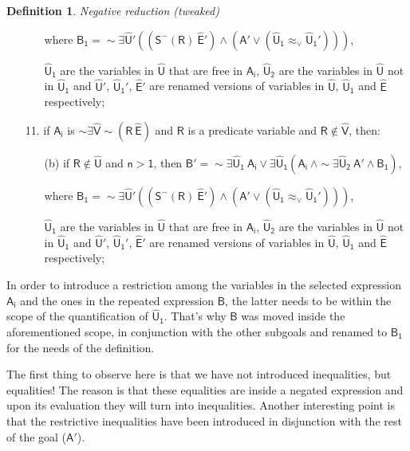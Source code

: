 \documentclass[inscr,ack,preface]{dithesis}
\theoremstyle{definition}
\newtheorem{definition}{Definition}[]
\newcommand{\msf}[1]{$\mathsf{#1}$}
\begin{document}
\begin{definition}{\emph{Negative reduction (tweaked)}}
\begin{enumerate}
\begin{enumerate}
                where \msf{B_{1} = \sim\exists \widehat{U}' \left( \left( S^{-}\left( R \right) ~\widehat{E}' \right) \land \left( A' \lor \left( \widehat{U}_{1} \approx_{\lor} \widehat{U}_{1}' \right) \right) \right)},

                \msf{\widehat{U}_1} are the variables in \msf{\widehat{U}} that are free in \msf{A_i}, \msf{\widehat{U}_2} are the variables in \msf{\widehat{U}} not in \msf{\widehat{U}_1} and \msf{\widehat{U}'}, \msf{\widehat{U}_{1}'}, \msf{\widehat{E}'} are renamed versions of variables in \msf{\widehat{U}}, \msf{\widehat{U}_{1}} and \msf{\widehat{E}} respectively;
        \end{enumerate}
  \item[11.] if \msf{A_i} is \msf{\sim \exists \widehat{V} \sim \left( R ~ \widehat{E} \right)} and \msf{R} is a predicate variable and \msf{R \not\in \widehat{V}}, then:
        \begin{enumerate}
          \item[(b)] if \msf{R \not\in \widehat{U}} and \msf{n > 1},
                then \msf{B' = \sim \exists \widehat{U}_1 ~ A_i \lor \exists \widehat{U}_1 \left( A_i ~ \land \sim \exists \widehat{U}_2 ~ A' \land B_{1} \right)},

                where \msf{B_{1} = \sim\exists \widehat{U}' \left( \left( S^{-}\left( R \right) ~\widehat{E}' \right) \land \left( A' \lor \left( \widehat{U}_{1} \approx_{\lor} \widehat{U}_{1}' \right) \right) \right)},

                \msf{\widehat{U}_1} are the variables in \msf{\widehat{U}} that are free in \msf{A_i}, \msf{\widehat{U}_2} are the variables in \msf{\widehat{U}} not in \msf{\widehat{U}_1} and \msf{\widehat{U}'}, \msf{\widehat{U}_{1}'}, \msf{\widehat{E}'} are renamed versions of variables in \msf{\widehat{U}}, \msf{\widehat{U}_{1}} and \msf{\widehat{E}} respectively;
        \end{enumerate}
\end{enumerate}
\end{definition}

In order to introduce a restriction among the variables in the selected expression \msf{A_i} and the ones in the repeated expression \msf{B}, the latter needs to be within the scope of the quantification of \msf{\widehat{U}_1}. That's why \msf{B} was moved inside the aforementioned scope, in conjunction with the other subgoals and renamed to \msf{B_1} for the needs of the definition.

The first thing to observe here is that we have not introduced inequalities, but equalities! The reason is that these equalities are inside a negated expression and upon its evaluation they will turn into inequalities. Another interesting point is that the restrictive inequalities have been introduced in disjunction with the rest of the goal (\msf{A'}).
\end{document}
